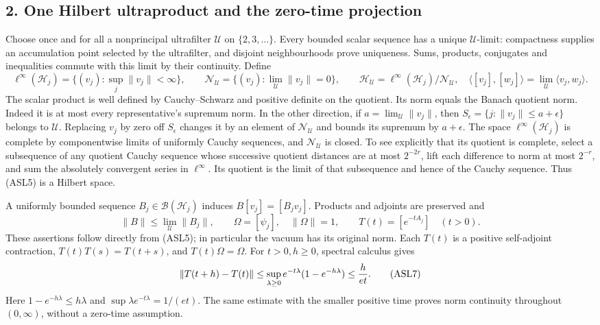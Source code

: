 \documentclass[11pt]{article}
\begin{document}
\subsection*{2. One Hilbert ultraproduct and the zero-time projection}

Choose once and for all a nonprincipal ultrafilter \(\mathcal U\) on \(\{2,3,\ldots\}\). Every bounded scalar sequence has a unique \(\mathcal U\)-limit: compactness supplies an accumulation point selected by the ultrafilter, and disjoint neighbourhoods prove uniqueness. Sums, products, conjugates and inequalities commute with this limit by their continuity. Define
\[
 \ell^\infty(\mathcal H_j)=\{(v_j):\sup_j\|v_j\|<\infty\},\qquad
 \mathcal N_{\mathcal U}=\{(v_j):\lim_{\mathcal U}\|v_j\|=0\},\qquad
 \mathcal H_{\mathcal U}=\ell^\infty(\mathcal H_j)/\mathcal N_{\mathcal U},
 \quad \langle[v_j],[w_j]\rangle=\lim_{\mathcal U}\langle v_j,w_j\rangle.
 \tag{ASL5}
\]
The scalar product is well defined by Cauchy–Schwarz and positive definite on the quotient. Its norm equals the Banach quotient norm. Indeed it is at most every representative's supremum norm. In the other direction, if \(a=\lim_{\mathcal U}\|v_j\|\), then \(S_\epsilon=\{j:\|v_j\|\le a+\epsilon\}\) belongs to \(\mathcal U\). Replacing \(v_j\) by zero off \(S_\epsilon\) changes it by an element of \(\mathcal N_{\mathcal U}\) and bounds its supremum by \(a+\epsilon\). The space \(\ell^\infty(\mathcal H_j)\) is complete by componentwise limits of uniformly Cauchy sequences, and \(\mathcal N_{\mathcal U}\) is closed. To see explicitly that its quotient is complete, select a subsequence of any quotient Cauchy sequence whose successive quotient distances are at most \(2^{-2r}\), lift each difference to norm at most \(2^{-r}\), and sum the absolutely convergent series in \(\ell^\infty\). Its quotient is the limit of that subsequence and hence of the Cauchy sequence. Thus (ASL5) is a Hilbert space.

A uniformly bounded sequence \(B_j\in\mathcal B(\mathcal H_j)\) induces \(B[v_j]=[B_jv_j]\). Products and adjoints are preserved and
\[
 \|B\|\le\lim_{\mathcal U}\|B_j\|,\qquad
 \Omega=[\psi_j],\quad\|\Omega\|=1,\qquad
 T(t)=[e^{-tA_j}]\quad(t>0).
 \tag{ASL6}
\]
These assertions follow directly from (ASL5); in particular the vacuum has its original norm. Each \(T(t)\) is a positive self-adjoint contraction, \(T(t)T(s)=T(t+s)\), and \(T(t)\Omega=\Omega\). For \(t>0,h\ge0\), spectral calculus gives
\[
 \|T(t+h)-T(t)\|
 \le\sup_{\lambda\ge0}e^{-t\lambda}(1-e^{-h\lambda})
 \le {h\over et}.
 \tag{ASL7}
\]
Here \(1-e^{-h\lambda}\le h\lambda\) and \(\sup\lambda e^{-t\lambda}=1/(et)\). The same estimate with the smaller positive time proves norm continuity throughout \((0,\infty)\), without a zero-time assumption.
\end{document}
